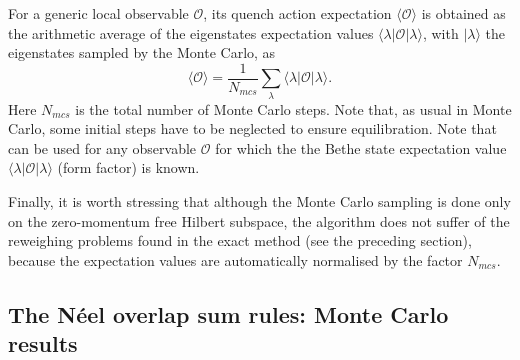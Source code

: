 \documentclass[11pt]{iopart}
\begin{document}
For a generic local observable ${\mathcal O}$, its quench action expectation $\langle{\mathcal O}
\rangle$ is obtained as the arithmetic average 
of the eigenstates expectation values $\langle\lambda|{\mathcal O}|\lambda\rangle$, 
with $|\lambda\rangle$ the eigenstates sampled by the Monte Carlo, as 
%
\begin{equation}
\label{qamc-obs}
\langle{\mathcal O}\rangle=\frac{1}{N_{mcs}}\sum\limits_{\lambda}\langle\lambda|
{\mathcal O}|\lambda\rangle. 
\end{equation}
%
Here $N_{mcs}$ is the total number of Monte Carlo steps. Note that, as usual in 
Monte Carlo, some initial steps have to be neglected to ensure equilibration. 
Note that~ can be used for any observable ${\mathcal O}$ for 
which the the Bethe state expectation value $\langle\lambda|{\mathcal O}|\lambda
\rangle$ (form factor) is known. 

Finally, it is worth stressing that although the Monte Carlo sampling is done only on the 
zero-momentum free Hilbert subspace, the algorithm does not suffer of the reweighing problems 
found in the exact method (see the preceding section), because the expectation values 
 are automatically normalised by the factor $N_{mcs}$.

\subsection{The N\'eel overlap sum rules: Monte Carlo results}
\label{sec:6.2}
\end{document}
